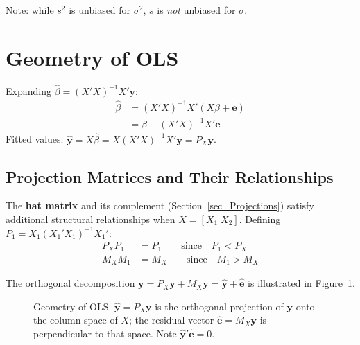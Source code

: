 Note: while $s^2$ is unbiased for $\sigma^2$, $s$ is \emph{not} unbiased
for $\sigma$.


\section{Geometry of OLS}
\label{sec_GeometryOLS}

Expanding $\hat\beta = (X'X)^{-1}X'\mathbf{y}$:
\begin{align*}
  \hat\beta
  &= (X'X)^{-1}X'(X\beta + \mathbf{e}) \\
  &= \beta + (X'X)^{-1}X'\mathbf{e}
\end{align*}
Fitted values: $\hat{\mathbf{y}} = X\hat\beta = X(X'X)^{-1}X'\mathbf{y} =
P_X\mathbf{y}$.

\subsection{Projection Matrices and Their Relationships}
\label{subsec_Projections}

The \textbf{hat matrix} and its complement
(Section~\ref{sec_Projections}) satisfy additional structural relationships
when $X = [X_1\;X_2]$. Defining $P_1 = X_1(X_1'X_1)^{-1}X_1'$:
\begin{align}
  P_X P_1 &= P_1 \qquad\text{since}\quad P_1 < P_X \label{eq_PP1} \\
  M_X M_1 &= M_X \qquad\text{since}\quad M_1 > M_X \label{eq_MM1}
\end{align}

The orthogonal decomposition $\mathbf{y} = P_X\mathbf{y} + M_X\mathbf{y}
= \hat{\mathbf{y}} + \hat{\mathbf{e}}$ is illustrated in
Figure~\ref{fig_GeomOLS}.

\begin{figure}[htp]
\centering
{}
\caption{Geometry of OLS. $\hat{\mathbf{y}} = P_X\mathbf{y}$ is the
orthogonal projection of $\mathbf{y}$ onto the column space of $X$; the
residual vector $\hat{\mathbf{e}} = M_X\mathbf{y}$ is perpendicular to
that space. Note $\hat{\mathbf{y}}'\hat{\mathbf{e}} = 0$.}
\label{fig_GeomOLS}
\end{figure}


